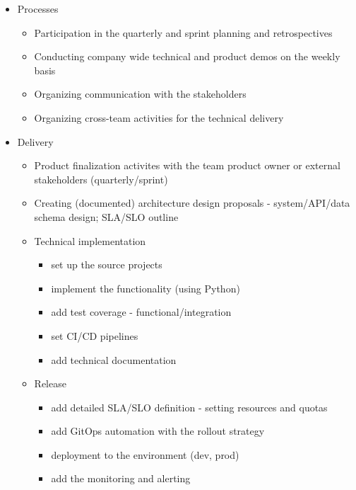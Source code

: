 \documentclass[11pt,a4paper,sans]{moderncv}
\begin{document}
{\begin{itemize}
\begin{itemize}
            \item Processes
                \begin{itemize}
                    \item Participation in the quarterly and sprint planning and retrospectives
                    \item Conducting company wide technical and product demos on the weekly basis
                    \item Organizing communication with the stakeholders 
                    \item Organizing cross-team activities for the technical delivery
                \end{itemize}
            \item Delivery 
                \begin{itemize}
                    \item Product finalization activites with the team product owner or external stakeholders (quarterly/sprint)
                    \item Creating (documented) architecture design proposals - system/API/data schema design; SLA/SLO outline
                    \item Technical implementation
                        \begin{itemize}
                            \item set up the source projects
                            \item implement the functionality (using Python)
                            \item add test coverage - functional/integration
                            \item set CI/CD pipelines
                            \item add technical documentation
                        \end{itemize}
                    \item Release
                        \begin{itemize}
                            \item add detailed SLA/SLO definition - setting resources and quotas
                            \item add GitOps automation with the rollout strategy
                            \item deployment to the environment (dev, prod) 
                            \item add the monitoring and alerting

\end{itemize}
\end{itemize}
\end{itemize}
\end{itemize}}
\end{document}
